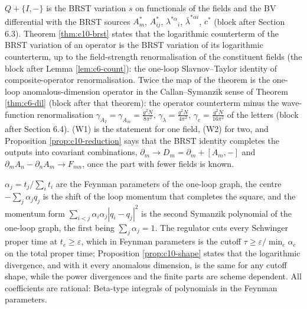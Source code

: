 \begin{remark}
$Q+\{I,-\}$ is the BRST variation $s$ on functionals of the fields and the BV differential with the BRST sources $A^*_m$, $A^*_{ij}$, $\lambda^{*\alpha}{}_i$, $\bar\lambda^{*\dot\alpha i}$, $c^*$ (block after Section 6.3). Theorem \ref{thm:c10-brst} states that the logarithmic counterterm of the BRST variation of an operator is the BRST variation of its logarithmic counterterm, up to the field-strength renormalisation of the constituent fields (the block after Lemma \ref{lem:c6-count}): the one-loop Slavnov--Taylor identity of composite-operator renormalisation. Twice the map of the theorem is the one-loop anomalous-dimension operator in the Callan--Symanzik sense of Theorem \ref{thm:c6-dil} (block after that theorem): the operator counterterm minus the wave-function renormalisation $\gamma_{A_I}=\gamma_{A_m}=\frac{g^2N}{8\pi^2}$, $\gamma_\lambda=\frac{g^2N}{4\pi^2}$, $\gamma_c=\frac{g^2N}{16\pi^2}$ of the letters (block after Section 6.4). (W1) is the statement for one field, (W2) for two, and Proposition \ref{prop:c10-reduction} says that the BRST identity completes the outputs into covariant combinations, $\partial_m\to D_m=\partial_m+[A_m,-]$ and $\partial_mA_n-\partial_nA_m\to F_{mn}$, once the part with fewer fields is known.
\end{remark}

\begin{remark}
$\alpha_j=t_j/\sum_it_i$ are the Feynman parameters of the one-loop graph, the centre $-\sum_j\alpha_jq_j$ is the shift of the loop momentum that completes the square, and the momentum form $\sum_{i<j}\alpha_i\alpha_j|q_i-q_j|^2$ is the second Symanzik polynomial of the one-loop graph, the first being $\sum_j\alpha_j=1$. The regulator cuts every Schwinger proper time at $t_e\ge\varepsilon$, which in Feynman parameters is the cutoff $\tau\ge\varepsilon/\min_e\alpha_e$ on the total proper time; Proposition \ref{prop:c10-shape} states that the logarithmic divergence, and with it every anomalous dimension, is the same for any cutoff shape, while the power divergences and the finite parts are scheme dependent. All coefficients are rational: Beta-type integrals of polynomials in the Feynman parameters.
\end{remark}

